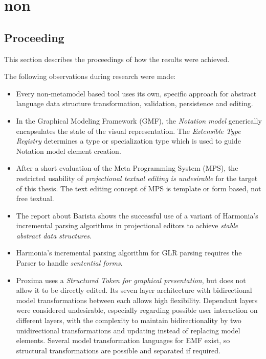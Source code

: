 \chapter{non}


\section{Proceeding} 
This section describes the proceedings of how the results were achieved.

The following observations during research were made:
\begin{itemize}
	\item Every non-metamodel based tool uses its own, specific approach for abstract language data structure transformation, validation, persistence and editing.
	\item In the Graphical Modeling Framework (GMF), the \emph{Notation model} generically encapsulates the state of the visual representation. The \emph{Extensible Type Registry} determines a type or specialization type which is used to guide Notation model element creation. 
	\item After a short evaluation of the Meta Programming System (MPS), the restricted usability of \emph{projectional textual editing is undesirable} for the target of this thesis. The text editing concept of MPS is template or form based, not free textual.
	\item The report \cite{Barista} about Barista shows the successful use of a variant of Harmonia's incremental parsing algorithms in projectional editors to achieve \emph{stable abstract data structures}.
	\item Harmonia's incremental parsing algorithm for GLR parsing requires the Parser to handle \emph{sentential forms}.
	\item Proxima uses a \emph{Structured Token for graphical presentation}, but does not allow it to be directly edited.  Its seven layer architecture with bidirectional model transformations between each allows high flexibility. Dependant layers were considered undesirable, especially regarding possible user interaction on different layers, with the complexity to maintain bidirectionality by two unidirectional transformations and updating instead of replacing model elements. Several model transformation languages for EMF exist, so structural transformations are possible and separated if required. 
\end{itemize}

